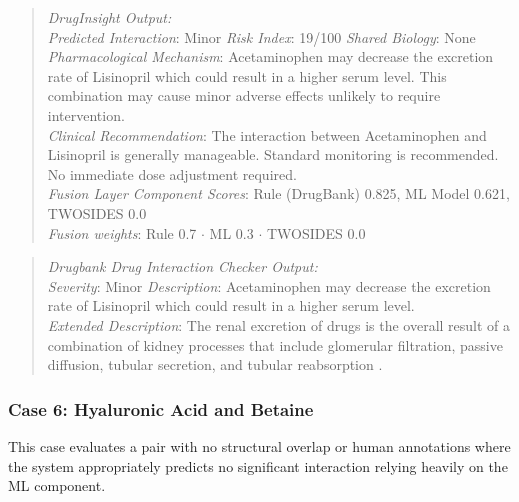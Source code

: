 \documentclass[conference]{IEEEtran}
\begin{document}
\begin{quote}
\textit{DrugInsight Output:}\\
\textit{Predicted Interaction}: Minor \newline\quad \textit{Risk Index}: 19/100\newline
\quad \textit{Shared Biology}: None\\ \newline
\textit{Pharmacological Mechanism}: Acetaminophen may decrease the excretion rate of Lisinopril which could result in a higher serum level. This combination may cause minor adverse effects unlikely to require intervention. \\ \newline
\textit{Clinical Recommendation}: The interaction between Acetaminophen and Lisinopril is generally manageable. Standard monitoring is recommended. No immediate dose adjustment required.\\ \newline
\textit{Fusion Layer Component Scores}: Rule (DrugBank) 0.825, ML Model 0.621, TWOSIDES 0.0\\ \newline
\textit{Fusion weights}: Rule 0.7 $\cdot$ ML 0.3 $\cdot$ TWOSIDES 0.0
\end{quote}

\begin{quote}
\textit{Drugbank Drug Interaction Checker Output:}\\
\quad \textit{Severity}: Minor \cite{drugbankchecker}\newline
\quad \textit{Description}: Acetaminophen may decrease the excretion rate of Lisinopril which could result in a higher serum level.\\ \newline
\textit{Extended Description}: The renal excretion of drugs is the overall result of a combination of kidney processes that include glomerular filtration, passive diffusion, tubular secretion, and tubular reabsorption \cite{vanginneken1989}. \\
\end{quote}

\subsubsection{\textbf{Case 6: Hyaluronic Acid and Betaine}}
This case evaluates a pair with no structural overlap or human annotations where the system appropriately predicts no significant interaction relying heavily on the ML component.
\end{document}
